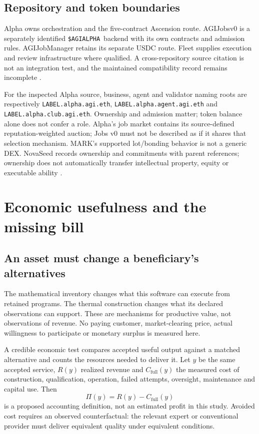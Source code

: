 \documentclass[11pt,a4paper]{article}
\newcommand{\AGI}{\texttt{\$AGIALPHA}}
\begin{document}
\subsection{Repository and token boundaries}
Alpha owns orchestration and the five-contract Ascension route. AGIJobsv0 is a separately identified \AGI\ backend with its own contracts and admission rules. AGIJobManager retains its separate USDC route. Fleet supplies execution and review infrastructure where qualified. A cross-repository source citation is not an integration test, and the maintained compatibility record remains incomplete \cite{compatibility}.

For the inspected Alpha source, business, agent and validator naming roots are respectively \texttt{LABEL.alpha.agi.eth}, \texttt{LABEL.alpha.agent.agi.eth} and \texttt{LABEL.alpha.club.agi.eth}. Ownership and admission matter; token balance alone does not confer a role. Alpha's job market contains its source-defined reputation-weighted auction; Jobs v0 must not be described as if it shares that selection mechanism. MARK's supported lot/bonding behavior is not a generic DEX. NovaSeed records ownership and commitments with parent references; ownership does not automatically transfer intellectual property, equity or executable ability \cite{ascensionsource,implementationmap}.
\FloatBarrier

\section{Economic usefulness and the missing bill}\label{sec:economics}
\subsection{An asset must change a beneficiary's alternatives}
The mathematical inventory changes what this software can execute from retained programs. The thermal construction changes what its declared observations can support. These are mechanisms for productive value, not observations of revenue. No paying customer, market-clearing price, actual willingness to participate or monetary surplus is measured here.

A credible economic test compares accepted useful output against a matched alternative and counts the resources needed to deliver it. Let \(y\) be the same accepted service, \(R(y)\) realized revenue and \(C_{\mathrm{full}}(y)\) the measured cost of construction, qualification, operation, failed attempts, oversight, maintenance and capital use. Then
\begin{equation}
\Pi(y)=R(y)-C_{\mathrm{full}}(y)
\label{eq:profit}
\end{equation}
is a proposed accounting definition, not an estimated profit in this study. Avoided cost requires an observed counterfactual: the relevant expert or conventional provider must deliver equivalent quality under equivalent conditions.
\end{document}
